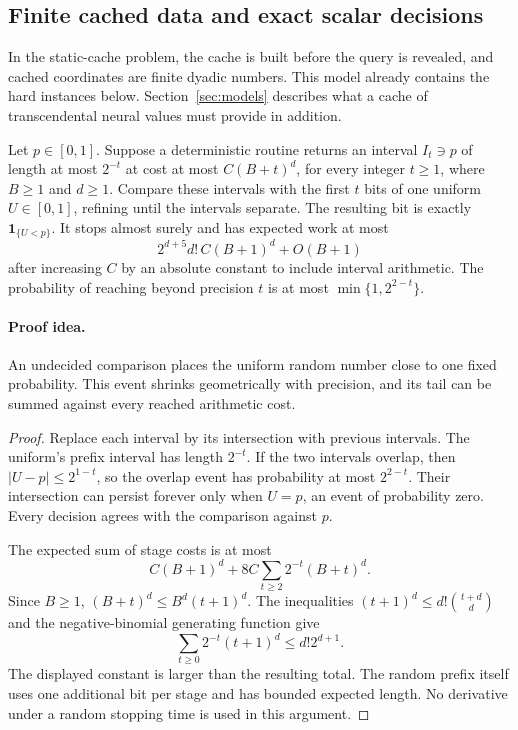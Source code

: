 \subsection{Finite cached data and exact scalar decisions}
\label{sec:newcachebits}

In the static-cache problem, the cache is built before the query is
revealed, and cached coordinates are finite dyadic numbers. This
model already contains the hard instances below.
Section~\ref{sec:models} describes what a cache of transcendental
neural values must provide in addition.

\begin{lemma}
\label{lem:newprecisionstop}
Let $p\in[0,1]$. Suppose a deterministic routine returns an interval
$I_t\ni p$ of length at most $2^{-t}$ at cost at most
$C(B+t)^d$, for every integer $t\ge1$, where $B\ge1$ and $d\ge1$.
Compare these intervals with the first $t$ bits of one uniform
$U\in[0,1]$, refining until the intervals separate. The resulting
bit is exactly $\mathbf1_{\{U<p\}}$. It stops almost surely and
has expected work at most
\[
 2^{d+5}d!\,C(B+1)^d+O(B+1)
\]
after increasing $C$ by an absolute constant to include interval
arithmetic. The probability of reaching beyond precision $t$ is
at most $\min\{1,2^{2-t}\}$.
\end{lemma}
\paragraph{Proof idea.}
An undecided comparison places the uniform random number close to one fixed probability.  This event shrinks geometrically with precision, and its tail can be summed against every reached arithmetic cost.

\begin{proof}
Replace each interval by its intersection with previous intervals.
The uniform's prefix interval has length $2^{-t}$. If the two
intervals overlap, then $|U-p|\le2^{1-t}$, so the overlap event has
probability at most $2^{2-t}$. Their intersection can persist
forever only when $U=p$, an event of probability zero. Every
decision agrees with the comparison against $p$.

The expected sum of stage costs is at most
\[
 C(B+1)^d+8C\sum_{t\ge2}2^{-t}(B+t)^d.
\]
Since $B\ge1$, $(B+t)^d\le B^d(t+1)^d$. The inequalities
$(t+1)^d\le d!\binom{t+d}{d}$ and the negative-binomial generating
function give
\[
 \sum_{t\ge0}2^{-t}(t+1)^d\le d!2^{d+1}.
\]
The displayed constant is larger than the resulting total. The
random prefix itself uses one additional bit per stage and has
bounded expected length. No derivative under a random stopping
time is used in this argument.
\end{proof}

